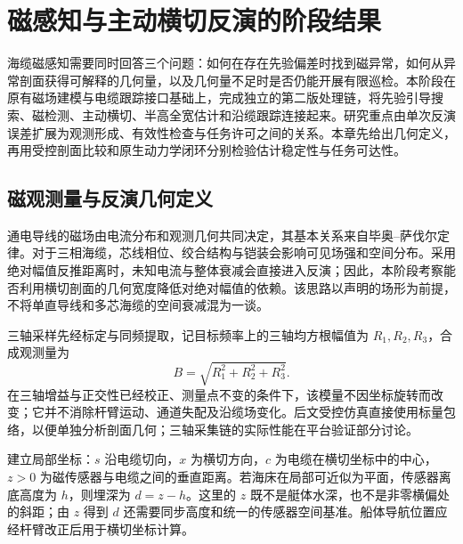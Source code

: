 \chapter{磁感知与主动横切反演的阶段结果}
\label{chap:middle-magnetic}

海缆磁感知需要同时回答三个问题：如何在存在先验偏差时找到磁异常，如何从异常剖面获得可解释的几何量，以及几何量不足时是否仍能开展有限巡检。本阶段在原有磁场建模与电缆跟踪接口基础上，完成独立的第二版处理链，将先验引导搜索、磁检测、主动横切、半高全宽估计和沿缆跟踪连接起来。研究重点由单次反演误差扩展为观测形成、有效性检查与任务许可之间的关系。本章先给出几何定义，再用受控剖面比较和原生动力学闭环分别检验估计稳定性与任务可达性。

\section{磁观测量与反演几何定义}
\label{sec:middle-mag-geometry}

通电导线的磁场由电流分布和观测几何共同决定，其基本关系来自毕奥--萨伐尔定律\cite{griffiths2017electrodynamics}。对于三相海缆，芯线相位、绞合结构与铠装会影响可见场强和空间分布。采用绝对幅值反推距离时，未知电流与整体衰减会直接进入反演；因此，本阶段考察能否利用横切剖面的几何宽度降低对绝对幅值的依赖。该思路以声明的场形为前提，不将单直导线和多芯海缆的空间衰减混为一谈。

三轴采样先经标定与同频提取，记目标频率上的三轴均方根幅值为 $R_1,R_2,R_3$，合成观测量为
\begin{equation}
 B=\sqrt{R_1^2+R_2^2+R_3^2}.
 \label{eq:middle-mag-envelope}
\end{equation}
在三轴增益与正交性已经校正、测量点不变的条件下，该模量不因坐标旋转而改变；它并不消除杆臂运动、通道失配及沿缆场变化。后文受控仿真直接使用标量包络，以便单独分析剖面几何；三轴采集链的实际性能在平台验证部分讨论。

建立局部坐标：$s$ 沿电缆切向，$x$ 为横切方向，$c$ 为电缆在横切坐标中的中心，$z>0$ 为磁传感器与电缆之间的垂直距离。若海床在局部可近似为平面，传感器离底高度为 $h$，则埋深为 $d=z-h$。这里的 $z$ 既不是艇体水深，也不是非零横偏处的斜距；由 $z$ 得到 $d$ 还需要同步高度和统一的传感器空间基准。船体导航位置应经杆臂改正后用于横切坐标计算。

